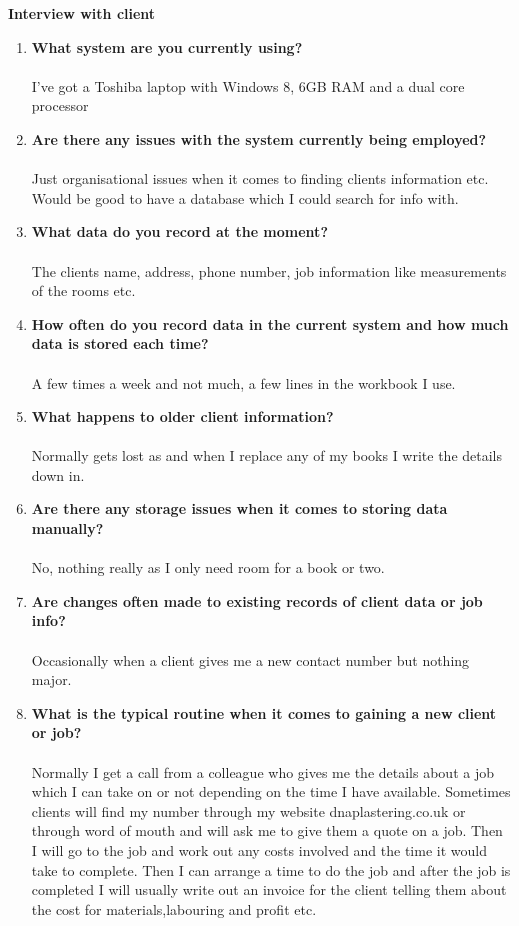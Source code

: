 \begin{flushleft}
	\textbf{Interview with client}
\end{flushleft}


\begin{enumerate}
	\item \textbf{What system are you currently using?}
		\\ \\ I've got a Toshiba laptop with Windows 8, 6GB RAM and a dual core processor
	\item \textbf{Are there any issues with the system currently being employed?}
		\\ \\Just organisational issues when it comes to finding clients information etc. Would be good to have a database which I could search for info with.
	\item \textbf{What data do you record at the moment?}
		\\ \\ The clients name, address, phone number, job information like measurements of the rooms etc.
	\item \textbf{How often do you record data in the current system and how much data is stored each time?}
		\\ \\ A few times a week and not much, a few lines in the workbook I use.
	\item \textbf{What happens to older client information?}
		\\ \\ Normally gets lost as and when I replace any of my books I write the details down in.
	\item \textbf{Are there any storage issues when it comes to storing data manually?}
		\\ \\ No, nothing really as I only need room for a book or two.
	\item \textbf{Are changes often made to existing records of client data or job info?}
		\\ \\ Occasionally when a client gives me a new contact number but nothing major.
	\item \textbf{What is the typical routine when it comes to gaining a new client or job?}
		\\ \\ Normally I get a call from a colleague who gives me the details about a job which I can take on or not depending on the time I have available. Sometimes clients will find my number through my website dnaplastering.co.uk or through word of mouth and will ask me to give them a quote on a job. Then I will go to the job and work out any costs involved and the time it would take to complete. Then I can arrange a time to do the job and after the job is completed I will usually write out an invoice for the client telling them about the cost for materials,labouring and profit etc.

\end{enumerate}
